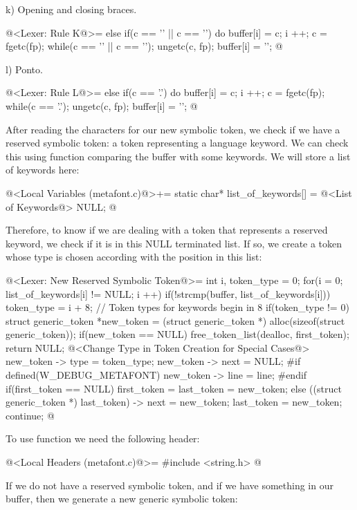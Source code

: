 k) Opening and closing braces.

\iniciocodigo
@<Lexer: Rule K@>=
else if(c == '{' || c == '}'){
  do{
    buffer[i] = c;
    i ++;
    c = fgetc(fp);
  } while(c == '{' || c == '}');
  ungetc(c, fp);
  buffer[i] = '\0';
}
@
\fimcodigo

l) Ponto.

\iniciocodigo
@<Lexer: Rule L@>=
else if(c == '.'){
  do{
    buffer[i] = c;
    i ++;
    c = fgetc(fp);
  } while(c == '.');
  ungetc(c, fp);
  buffer[i] = '\0';
}
@
\fimcodigo


After reading the characters for our new symbolic token, we check if
we have a reserved symbolic token: a token representing a language
keyword. We can check this using function 
comparing the buffer with some keywords. We will store a list of
keywords here:

\iniciocodigo
@<Local Variables (metafont.c)@>+=
static char* list_of_keywords[] = {
@<List of Keywords@>
  NULL};
@
\fimcodigo

Therefore, to know if we are dealing with a token that represents a
reserved keyword, we check if it is in this NULL terminated list. If
so, we create a token whose type is chosen according with the position
in this list:

\iniciocodigo
@<Lexer: New Reserved Symbolic Token@>=
{
  int i, token_type = 0;
  for(i = 0; list_of_keywords[i] != NULL; i ++)
    if(!strcmp(buffer, list_of_keywords[i]))
      token_type = i + 8; // Token types for keywords begin in 8
  if(token_type != 0){
    struct generic_token *new_token =
       (struct generic_token *) alloc(sizeof(struct generic_token));
    if(new_token == NULL){
      free_token_list(dealloc, first_token);
      return NULL;
    }
    @<Change Type in Token Creation for Special Cases@>
    new_token -> type = token_type;
    new_token -> next = NULL;
#if defined(W_DEBUG_METAFONT)
    new_token -> line = line;
#endif
    if(first_token == NULL)
      first_token = last_token = new_token;
    else{
      ((struct generic_token *) last_token) -> next = new_token;
      last_token = new_token;
    }
    continue;
  }
}
@
\fimcodigo

To use function  we need the following header:

\iniciocodigo
@<Local Headers (metafont.c)@>=
#include <string.h>
@
\fimcodigo


If we do not have a reserved symbolic token, and if we have something
in our buffer, then we generate a new generic symbolic token:

